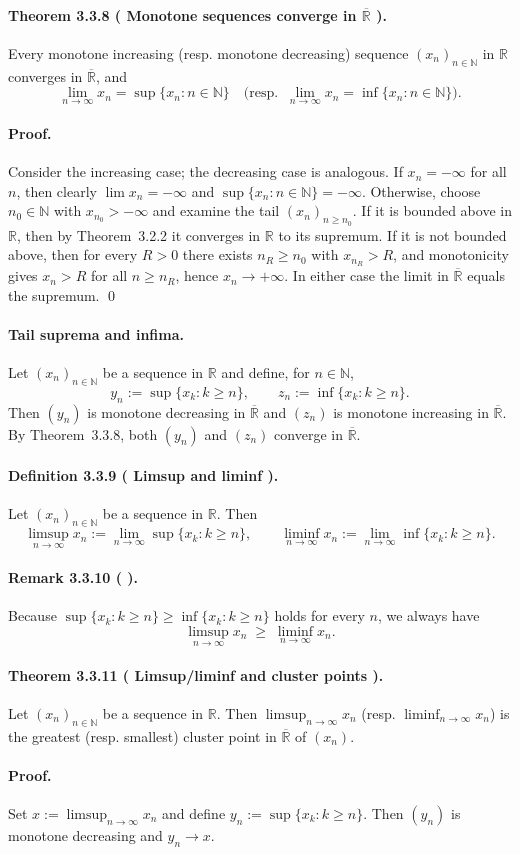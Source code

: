 \documentclass[12pt,a4paper]{article}
\newcommand{\N}{\mathbb{N}}
\newcommand{\R}{\mathbb{R}}
\newcommand{\NumberedDefinition}[3]{%
\paragraph*{Definition #1 ( #2 ).} #3\par}
\newcommand{\NumberedTheorem}[3]{%
\paragraph*{Theorem #1 ( #2 ).} #3\par}
\newcommand{\NumberedRemark}[3]{%
\paragraph*{Remark #1 ( #2 ).} #3\par}
\theoremstyle{plain}
\theoremstyle{definition}
\theoremstyle{remark}
\begin{document}
\NumberedTheorem{3.3.8}{Monotone sequences converge in $\overline{\R}$}{Every monotone increasing (resp. monotone decreasing) sequence $(x_n)_{n\in\N}$ in $\R$ converges in $\overline{\R}$, and
\[
	\lim_{n\to\infty} x_n = \sup\{x_n: n\in\N\}\quad \big(\text{resp. }\ \lim_{n\to\infty} x_n = \inf\{x_n: n\in\N\}\big).
\]
\paragraph{Proof.} Consider the increasing case; the decreasing case is analogous. If $x_n=-\infty$ for all $n$, then clearly $\lim x_n=-\infty$ and $\sup\{x_n:n\in\N\}=-\infty$. Otherwise, choose $n_0\in\N$ with $x_{n_0}>-\infty$ and examine the tail $(x_n)_{n\ge n_0}$. If it is bounded above in $\R$, then by Theorem~3.2.2 it converges in $\R$ to its supremum. If it is not bounded above, then for every $R>0$ there exists $n_R\ge n_0$ with $x_{n_R}>R$, and monotonicity gives $x_n>R$ for all $n\ge n_R$, hence $x_n\to +\infty$. In either case the limit in $\overline{\R}$ equals the supremum. \qed}

\paragraph{Tail suprema and infima.} Let $(x_n)_{n\in\N}$ be a sequence in $\R$ and define, for $n\in\N$,
\[
	y_n := \sup\{ x_k : k\ge n\}, \qquad z_n := \inf\{ x_k : k\ge n\}.
\]
Then $(y_n)$ is monotone decreasing in $\overline{\R}$ and $(z_n)$ is monotone increasing in $\overline{\R}$. By Theorem~3.3.8, both $(y_n)$ and $(z_n)$ converge in $\overline{\R}$.

\NumberedDefinition{3.3.9}{Limsup and liminf}{Let $(x_n)_{n\in\N}$ be a sequence in $\R$. Then
\[
	\limsup_{n\to\infty} x_n := \lim_{n\to\infty} \sup\{x_k : k\ge n\},
	\qquad
	\liminf_{n\to\infty} x_n := \lim_{n\to\infty} \inf\{x_k : k\ge n\}.
\]}

\NumberedRemark{3.3.10}{}{Because $\sup\{x_k : k\ge n\} \ge \inf\{x_k : k\ge n\}$ holds for every $n$, we always have
\[
	\limsup_{n\to\infty} x_n \;\ge\; \liminf_{n\to\infty} x_n.
\]}

\NumberedTheorem{3.3.11}{Limsup/liminf and cluster points}{Let $(x_n)_{n\in\N}$ be a sequence in $\R$. Then $\limsup_{n\to\infty} x_n$ (resp. $\liminf_{n\to\infty} x_n$) is the greatest (resp. smallest) cluster point in $\overline{\R}$ of $(x_n)$.}

\paragraph{Proof.} Set $x := \limsup_{n\to\infty} x_n$ and define $y_n := \sup\{x_k : k\ge n\}$. Then $(y_n)$ is monotone decreasing and $y_n\to x$.
\end{document}
